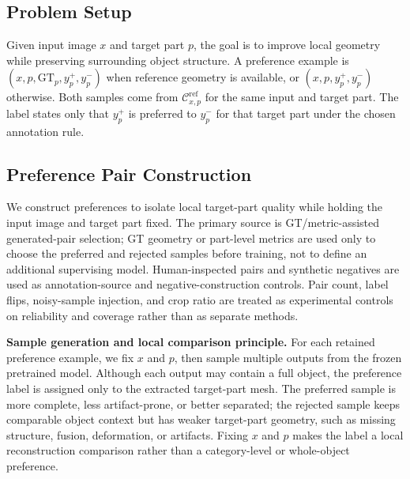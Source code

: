 \documentclass[10pt,twocolumn,letterpaper]{article}
\begin{document}
\subsection{Problem Setup}
Given input image $x$ and target part $p$, the goal is to improve local geometry while preserving surrounding object structure. A preference example is $(x,p,\mathrm{GT}_p,y_p^+,y_p^-)$ when reference geometry is available, or $(x,p,y_p^+,y_p^-)$ otherwise. Both samples come from $\mathcal{C}_{x,p}^{\mathrm{ref}}$ for the same input and target part. The label states only that $y_p^+$ is preferred to $y_p^-$ for that target part under the chosen annotation rule.

\subsection{Preference Pair Construction}
\label{sec:pair_construction}
We construct preferences to isolate local target-part quality while holding the input image and target part fixed. The primary source is GT/metric-assisted generated-pair selection; GT geometry or part-level metrics are used only to choose the preferred and rejected samples before training, not to define an additional supervising model. Human-inspected pairs and synthetic negatives are used as annotation-source and negative-construction controls. Pair count, label flips, noisy-sample injection, and crop ratio are treated as experimental controls on reliability and coverage rather than as separate methods.

\noindent\textbf{Sample generation and local comparison principle.}
For each retained preference example, we fix $x$ and $p$, then sample multiple outputs from the frozen pretrained model. Although each output may contain a full object, the preference label is assigned only to the extracted target-part mesh. The preferred sample is more complete, less artifact-prone, or better separated; the rejected sample keeps comparable object context but has weaker target-part geometry, such as missing structure, fusion, deformation, or artifacts. Fixing $x$ and $p$ makes the label a local reconstruction comparison rather than a category-level or whole-object preference.
\end{document}

